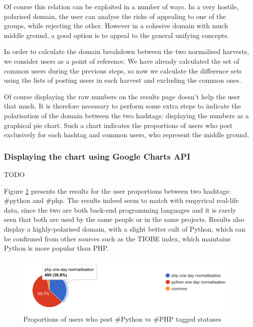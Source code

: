 \documentclass[12pt,a4paper,twoside]{report}
\begin{document}
Of course this relation can be exploited in a number of ways. In a very hostile, polarised domain, the user can analyse the risks of appealing to one of the groups, while rejecting the other. However in a cohesive domain with much middle ground, a good option is to appeal to the general unifying concepts.

In order to calculate the domain breakdown between the two normalised harvests, we consider users as a point of reference. We have already calculated the set of common users during the previous steps, so now we calculate the difference sets using the lists of posting users in each harvest and excluding the common ones.

Of course displaying the raw numbers on the results page doesn't help the user that much. It is therefore necessary to perform some extra steps to indicate the polarisation of the domain between the two hashtags: displaying the numbers as a graphical pie chart. Such a chart indicates the proportions of users who post exclusively for each hashtag and common users, who represent the middle ground.

\subsubsection{Displaying the chart using Google Charts API}
{\color{red} TODO
}

Figure \ref{fig:piechart} presents the results for the user proportions between two hashtags: \#python and \#php. The results indeed seem to match with empyrical real-life data, since the two are both back-end programming languages and it is rarely seen that both are used by the same people or in the same projects. Results also display a highly-polarised domain, with a slight better cult of Python, which can be confirmed from other sources such as the TIOBE index, which maintains Python is more popular than PHP.

\begin{figure}
    \centering
\includegraphics[width=\columnwidth]{img/piechart.png}
    \caption{Proportions of users who post \#Python vs \#PHP tagged statuses}
    \label{fig:piechart}
\end{figure}
\end{document}
